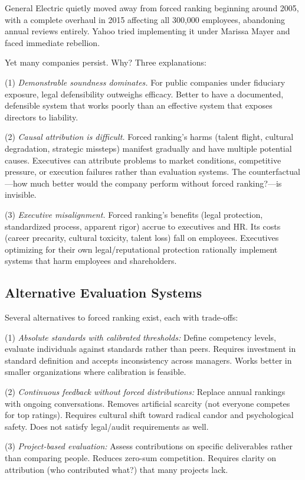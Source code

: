 \documentclass[12pt]{article}
\begin{document}
General Electric quietly moved away from forced ranking beginning around 2005, with a complete overhaul in 2015 affecting all 300,000 employees, abandoning annual reviews entirely. Yahoo tried implementing it under Marissa Mayer and faced immediate rebellion.

Yet many companies persist. Why? Three explanations:

(1) \emph{Demonstrable soundness dominates.} For public companies under fiduciary exposure, legal defensibility outweighs efficacy. Better to have a documented, defensible system that works poorly than an effective system that exposes directors to liability.

(2) \emph{Causal attribution is difficult.} Forced ranking's harms (talent flight, cultural degradation, strategic missteps) manifest gradually and have multiple potential causes. Executives can attribute problems to market conditions, competitive pressure, or execution failures rather than evaluation systems. The counterfactual---how much better would the company perform without forced ranking?---is invisible.

(3) \emph{Executive misalignment.} Forced ranking's benefits (legal protection, standardized process, apparent rigor) accrue to executives and HR. Its costs (career precarity, cultural toxicity, talent loss) fall on employees. Executives optimizing for their own legal/reputational protection rationally implement systems that harm employees and shareholders.

\subsection{Alternative Evaluation Systems}

Several alternatives to forced ranking exist, each with trade-offs:

(1) \emph{Absolute standards with calibrated thresholds:} Define competency levels, evaluate individuals against standards rather than peers. Requires investment in standard definition and accepts inconsistency across managers. Works better in smaller organizations where calibration is feasible.

(2) \emph{Continuous feedback without forced distributions:} Replace annual rankings with ongoing conversations. Removes artificial scarcity (not everyone competes for top ratings). Requires cultural shift toward radical candor and psychological safety. Does not satisfy legal/audit requirements as well.

(3) \emph{Project-based evaluation:} Assess contributions on specific deliverables rather than comparing people. Reduces zero-sum competition. Requires clarity on attribution (who contributed what?) that many projects lack.
\end{document}
